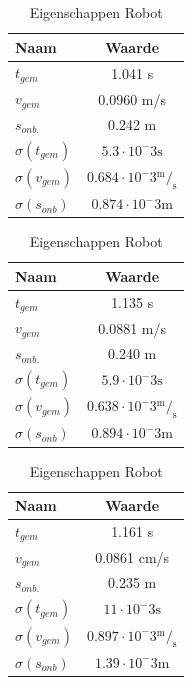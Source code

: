 \documentclass{report}
\begin{document}
\begin{table}
	\centering
	\caption{Eigenschappen Robot}
	\label{tab:resCali}
	\begin{subtable}[b]{0.30\textwidth}
		\centering
		\begin{tabular}{| l| c|}
		\hline
			Naam & Waarde \\
		\hline
			$t_{gem}$ & 1.041 s \\
		\hline
			$v_{gem}$ & 0.0960 m/s \\
		\hline
			$s_{onb.}$ & 0.242 m \\
		\hline		  
		   $\sigma(t_{gem})$ & $ 5.3 \cdot 10^-3 \mathrm{s}$  \\
		\hline
		   $\sigma(v_{gem})$ & $0.684 \cdot 10^-3  \mathrm{ ^m/_s}$ \\
		\hline
		$\sigma(s_{onb})$ & $0.874 \cdot 10^-3 \mathrm{m}$ \\
		\hline
		\end{tabular}
	\end{subtable}
	\quad
	\begin{subtable}[b]{0.30\textwidth}
		\centering
		\begin{tabular}{| l| c|}
		\hline
		   Naam & Waarde \\
		\hline
		   $t_{gem}$ & 1.135 s \\
		\hline
		   $v_{gem}$ & 0.0881 m/s \\
		\hline
		$s_{onb.}$ & 0.240 m \\
		\hline		  
		   $\sigma(t_{gem})$ & $5.9 \cdot 10^-3 \mathrm{s}$  \\
		\hline
		   $\sigma(v_{gem})$ & $0.638 \cdot 10^-3  \mathrm{ ^m/_s}$ \\
		\hline
		$\sigma(s_{onb})$ &$ 0.894 \cdot 10^-3 \mathrm{m}$ \\
		\hline
		\end{tabular}
	\end{subtable}
	\quad
	\begin{subtable}[b]{0.30\textwidth}
		\centering
		\begin{tabular}{| l| c|}
		\hline
		   Naam & Waarde \\
		\hline
		   $t_{gem}$ & 1.161 s \\
		\hline
		   $v_{gem}$ & 0.0861 cm/s \\
		\hline
			$s_{onb.}$ & 0.235 m \\
		\hline		  
		   $\sigma(t_{gem})$ & $11 \cdot 10^-3\mathrm{s}$  \\
		\hline
		   $\sigma(v_{gem})$ & $0.897 \cdot 10^-3 \mathrm{ ^m/_s}$ \\
		\hline
		$\sigma(s_{onb})$ & $1.39 \cdot 10^-3 \mathrm{m}$ \\
		\hline
		\end{tabular}
	\end{subtable}
\end{table}
\end{document}
